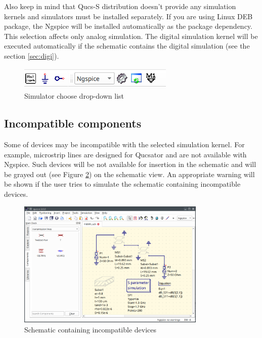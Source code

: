 \documentclass[a4paper,12pt]{article}
\begin{document}
Also keep in mind that Qucs-S distribution doesn't provide any simulation kernels and simulators must be installed separately. If you are using Linux DEB package, the Ngspice will be installed automatically as the package dependency. This selection affects only analog simulation. The digital simulation kernel will be executed automatically if the schematic contains the digital simulation (see the section \ref{sec:digi}).  

    \begin{figure}[!ht]
    \begin{center}
        \includegraphics[width=0.66\textwidth]{img/sim_switch.png}
    \end{center}
    \caption{Simulator choose drop-down list} \label{fig:sim_switch}
    \end{figure}

\subsection{Incompatible components}
    
Some of devices may be incompatible with the selected simulation kernel. For example, microstrip lines are designed for Qucsator and are not available with Ngspice. Such devices will be not available for insertion in the schematic and will be grayed out (see Figure \ref{fig:grey}) on the schematic view. An appropriate warning will be shown if the user tries to simulate the schematic containing incompatible devices.

    \begin{figure}[!ht]
    \begin{center}
        \includegraphics[width=0.8\textwidth]{img/ms_grey.png}
    \end{center}
    \caption{Schematic containing incompatible devices} \label{fig:grey}
    \end{figure}
\end{document}
